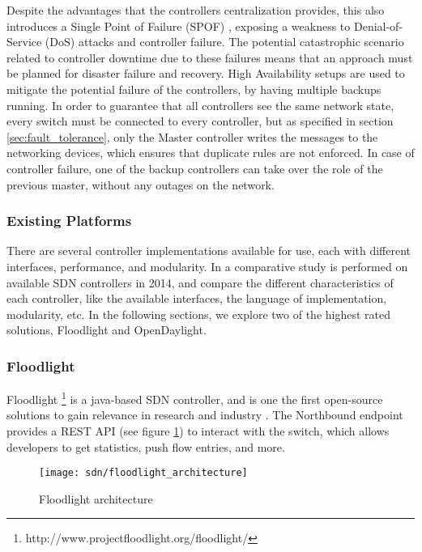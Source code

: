 \begin {enumerate}
\begin{enumerate}
\par Despite the advantages that the controllers centralization provides, this also introduces a Single Point of Failure (SPOF) \cite{phemius_disco:_2014}, exposing
a weakness to Denial-of-Service (DoS) attacks and controller failure. The potential catastrophic scenario related to controller downtime due to these
failures means that an approach must be planned for disaster failure and recovery. High Availability setups are used to mitigate the potential failure of
the controllers, by having multiple backups running. In order to guarantee that all controllers see the same network state, every switch must be connected to 
every controller, but as specified in section \ref{sec:fault_tolerance}, only the Master controller writes the messages to the networking devices, which
ensures that duplicate rules are not enforced. In case of controller failure, one of the backup controllers can take over the role of the previous master,
without any outages on the network.

\subsubsection{Existing Platforms}

There are several controller implementations available for use, each with different interfaces, performance, and modularity. In \cite{khondoker_feature-based_2014} a
comparative study is performed on available SDN controllers in 2014, and compare the different characteristics of each controller, like the available
interfaces, the language of implementation, modularity, etc. In the following sections, we explore two of the highest rated solutions, Floodlight and
OpenDaylight.

\subsubsection {Floodlight} \label{chap:flood}

Floodlight \footnote{http://www.projectfloodlight.org/floodlight/} is a java-based SDN controller, and is one the first open-source solutions to gain relevance in
research and industry \cite{berde_onos:_2014}. The Northbound endpoint provides a REST API (see figure \ref{fig:flood_arch}) to interact with the switch, which
allows developers to get statistics, push flow entries, and more. 

\begin{figure}[H]
  \centering
  \texttt{[image: sdn/floodlight\_architecture]}\label{fig:flood_arch}
  \caption {Floodlight architecture \cite{project_floodlight_floodlight_2017}}
  \label{fig:flood_arch}
\end{figure}


\end{enumerate}
\end{enumerate}
